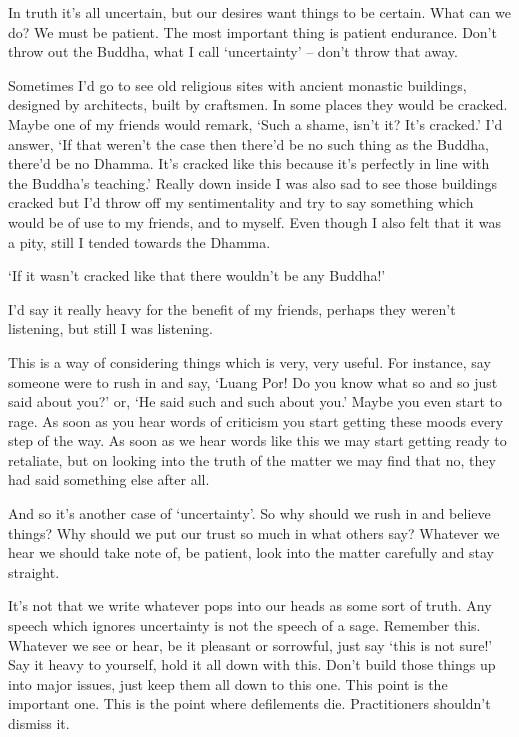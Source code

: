 In truth it's all uncertain, but our desires want things to be certain. What can we do? We must be patient. The most important thing is  patient endurance. Don't throw out the Buddha, what I call `uncertainty' -- don't throw that away.

Sometimes I'd go to see old religious sites with ancient monastic buildings, designed by architects, built by craftsmen. In some places they would be cracked. Maybe one of my friends would remark, `Such a shame, isn't it? It's cracked.' I'd answer, `If that weren't the case then there'd be no such thing as the Buddha, there'd be no Dhamma. It's cracked like this because it's perfectly in line with the Buddha's teaching.' Really down inside I was also sad to see those buildings cracked but I'd throw off my sentimentality and try to say something which would be of use to my friends, and to myself. Even though I also felt that it was a pity, still I tended towards the Dhamma.

`If it wasn't cracked like that there wouldn't be any Buddha!'

I'd say it really heavy for the benefit of my friends, perhaps they weren't listening, but still I was listening.

This is a way of considering things which is very, very useful. For instance, say someone were to rush in and say, `Luang Por! Do you know what so and so just said about you?' or, `He said such and such about you.' Maybe you even start to rage. As soon as you hear words of criticism you start getting these moods every step of the way. As soon as we hear words like this we may start getting ready to retaliate, but on looking into the truth of the matter we may find that no, they had said something else after all.

And so it's another case of `uncertainty'. So why should we rush in and believe things? Why should we put our trust so much in what others say? Whatever we hear we should take note of, be patient, look into the matter carefully and stay straight.

It's not that we write whatever pops into our heads as some sort of truth. Any speech which ignores uncertainty is not the speech of a sage. Remember this. Whatever we see or hear, be it pleasant or sorrowful, just say `this is not sure!' Say it heavy to yourself, hold it all down with this. Don't build those things up into major issues, just keep them all down to this one. This point is the important one. This is the point where defilements die. Practitioners shouldn't dismiss it.


